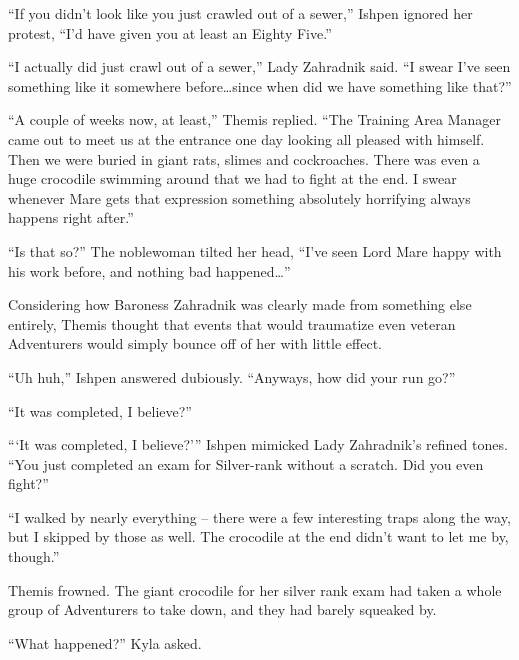  

“If you didn’t look like you just crawled out of a sewer,” Ishpen ignored her protest, “I’d have given you at least an Eighty Five.”

 

“I actually did just crawl out of a sewer,” Lady Zahradnik said. “I swear I’ve seen something like it somewhere before…since when did we have something like that?”

 

“A couple of weeks now, at least,” Themis replied. “The Training Area Manager came out to meet us at the entrance one day looking all pleased with himself. Then we were buried in giant rats, slimes and cockroaches. There was even a huge crocodile swimming around that we had to fight at the end. I swear whenever Mare gets that expression something absolutely horrifying always happens right after.”

 

“Is that so?” The noblewoman tilted her head, “I’ve seen Lord Mare happy with his work before, and nothing bad happened…”

 

Considering how Baroness Zahradnik was clearly made from something else entirely, Themis thought that events that would traumatize even veteran Adventurers would simply bounce off of her with little effect.

 

“Uh huh,” Ishpen answered dubiously. “Anyways, how did your run go?”

 

“It was completed, I believe?”

 

“‘It was completed, I believe?’” Ishpen mimicked Lady Zahradnik’s refined tones. “You just completed an exam for Silver-rank without a scratch. Did you even fight?”

 

“I walked by nearly everything – there were a few interesting traps along the way, but I skipped by those as well. The crocodile at the end didn’t want to let me by, though.”

 

Themis frowned. The giant crocodile for her silver rank exam had taken a whole group of Adventurers to take down, and they had barely squeaked by.

 

“What happened?” Kyla asked.

 

